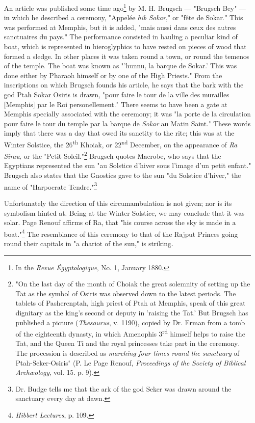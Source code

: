 \documentclass[a4paper, 11pt, oneside, polutonikogreek, english]{article}
\begin{document}
An article was published some time ago\footnote{In the \emph{Revue Égyptologique}, No. 1, January 1880.} by M. H. Brugsch --- "Brugsch Bey" --- in which he described a ceremony, "Appelée \emph{hib Sokar}," or "fête de Sokar." This was performed at Memphis, but it is added, "mais aussi dans ceux des autres sanctuaires du pays." The performance consisted in hauling a peculiar kind of boat, which is represented in hieroglyphics to have rested on pieces of wood that formed a sledge. In other places it was taken round a town, or round the temenos of the temple. The boat was known as "'hunnu, la barque de Sokar.' This was done either by Pharaoh himself or by one of the High Priests." From the inscriptions on which Brugsch founds his article, he says that the bark with the god Ptah Sokar Osiris is drawn, "pour faire le tour de la ville des murailles [Memphis] par le Roi personellement." There seems to have been a gate at Memphis specially associated with the ceremony; it was "la porte de la circulation pour faire le tour du temple par la barque de \emph{Sokar} au Matin Saint." These words imply that there was a day that owed its sanctity to the rite; this was at the Winter Solstice, the 26\textsuperscript{th} Khoiak, or 22\textsuperscript{nd} December, on the appearance of \emph{Ra Sirau}, or the "Petit Soleil."\footnote{"On the last day of the month of Choiak the great solemnity of setting up the Tat as the symbol of Osiris was observed down to the latest periods. The tablets of Pasherenptah, high priest of Ptah at Memphis, speak of this great dignitary as the king's second or deputy in 'raising the Tat.' But Brugsch has published a picture (\emph{Thesaurus}, v. 1190), copied by Dr. Erman from a tomb of the eighteenth dynasty, in which Amenophis 3\textsuperscript{rd} himself helps to raise the Tat, and the Queen Ti and the royal princesses take part in the ceremony. The procession is described as \emph{marching four times round the sanctuary} of Ptah-Seker-Osiris" (P. Le Page Renouf, \emph{Proceedings of the Society of Biblical Archæology}, vol. 15. p. 9).} Brugsch quotes Macrobe, who says that the Egyptians represented the sun "au Solstice d'hiver sous l'image d'un petit enfant." Brugsch also states that the Gnostics gave to the sun "du Solstice d'hiver," the name of "Harpocrate Tendre."\footnote{Dr. Budge tells me that the ark of the god Seker was drawn around the sanctuary every day at dawn.}

Unfortunately the direction of this circumambulation is not given; nor is its symbolism hinted at. Being at the Winter Solstice, we may conclude that it was solar. Page Renouf affirms of Ra, that "his course across the sky is made in a boat."\footnote{\emph{Hibbert Lectures}, p. 109.} The resemblance of this ceremony to that of the Rajput Princes going round their capitals in "a chariot of the sun," is striking.
\end{document}

